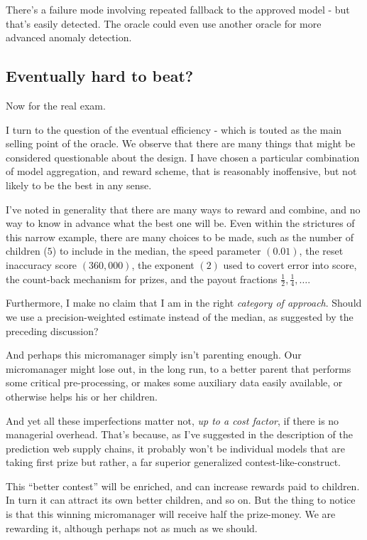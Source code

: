 There's a failure mode involving repeated fallback to the approved model - but that's easily detected. The oracle could even use another oracle for more advanced anomaly detection. 

\subsection{Eventually hard to beat?}

Now for the real exam. 

I turn to the question of the eventual efficiency - which is touted as the main selling point of the oracle. We observe that there are many things that might be considered questionable about the design. I have chosen a particular combination of model aggregation, and reward scheme, that is reasonably inoffensive, but not likely to be the best in any sense. 

I've noted in generality that there are many ways to reward and combine, and no way to know in advance what the best one will be. Even within the strictures of this narrow example, there are many choices to be made, such as the number of children ($5$) to include in the median, the speed parameter $(0.01)$, the reset inaccuracy score $(360,000)$, the exponent $(2)$ used to covert error into score, the count-back mechanism for prizes, and the payout fractions $\frac{1}{2},\frac{1}{4},\dots$. 

Furthermore, I make no claim that I am in the right {\em category of approach}. Should we use a precision-weighted estimate instead of the median, as suggested by the preceding discussion? 


And perhaps this micromanager simply isn't parenting enough. Our micromanager might lose out, in the long run, to a better parent that performs some critical pre-processing, or makes some auxiliary data easily available, or otherwise helps his or her children. 

And yet all these imperfections matter not, {\em up to a cost factor}, if there is no managerial overhead. That's because, as I've suggested in the description of the prediction web supply chains, it probably won't be individual models that are taking first prize but rather, a far superior generalized contest-like-construct. 

This ``better contest'' will be enriched, and can increase rewards paid to children. In turn it can attract its own better children, and so on. But the thing to notice is that this winning micromanager will receive half the prize-money. We are rewarding it, although perhaps not as much as we should. 

